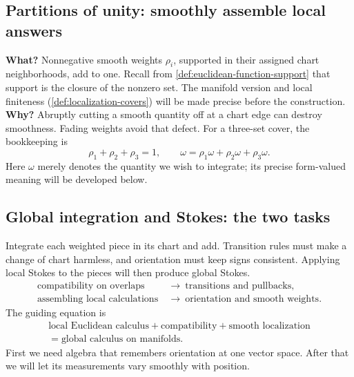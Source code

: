 \subsection*{Partitions of unity: smoothly assemble local answers}
\textbf{What?} Nonnegative smooth weights $\rho_i$, supported in their
assigned chart neighborhoods, add to one. Recall from \cref{def:euclidean-function-support} that support is the
closure of the nonzero set. The manifold version and local finiteness
(\cref{def:localization-covers}) will be made precise before the construction. \textbf{Why?} Abruptly cutting a smooth
quantity off at a chart edge can destroy smoothness. Fading weights avoid
that defect. For a three-set cover, the bookkeeping is
\[
\rho_1+\rho_2+\rho_3=1,\qquad
\omega=\rho_1\omega+\rho_2\omega+\rho_3\omega.
\]
Here $\omega$ merely denotes the quantity we wish to integrate; its
precise form-valued meaning will be developed below.


\subsection*{Global integration and Stokes: the two tasks}
Integrate each weighted piece in its chart and add. Transition rules must
make a change of chart harmless, and orientation must keep signs consistent.
Applying local Stokes to the pieces will then produce global Stokes.
\[
\boxed{\begin{aligned}
\text{compatibility on overlaps}&\ \longrightarrow\ \text{transitions and pullbacks},\\
\text{assembling local calculations}&\ \longrightarrow\ \text{orientation and smooth weights}.
\end{aligned}}
\]
The guiding equation is
\[
\boxed{\begin{gathered}
\text{local Euclidean calculus}+\text{compatibility}+\text{smooth localization}\\
=\text{global calculus on manifolds}.
\end{gathered}}
\]
First we need algebra that remembers orientation at one vector space.
After that we will let its measurements vary smoothly with position.


